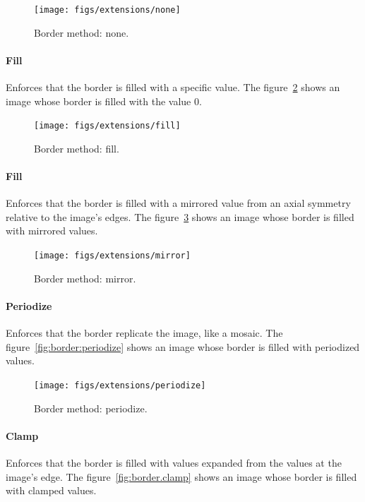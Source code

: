 \begin{figure}[tbh]
  \centering
  \texttt{[image: figs/extensions/none]}
  \label{fig:border.none}
  \caption{Border method: none.}
\end{figure}

\paragraph{Fill} Enforces that the border is filled with a specific value. The figure~\cref{fig:border.fill} shows an
image whose border is filled with the value $0$.

\begin{figure}[tbh]
  \centering
  \texttt{[image: figs/extensions/fill]}
  \label{fig:border.fill}
  \caption{Border method: fill.}
\end{figure}

\paragraph{Fill} Enforces that the border is filled with a mirrored value from an axial symmetry relative to the image's
edges. The figure~\cref{fig:border.mirror} shows an image whose border is filled with mirrored values.

\begin{figure}[tbh]
  \centering
  \texttt{[image: figs/extensions/mirror]}
  \label{fig:border.mirror}
  \caption{Border method: mirror.}
\end{figure}

\paragraph{Periodize} Enforces that the border replicate the image, like a mosaic. The
figure~\cref{fig:border:periodize} shows an image whose border is filled with periodized values.

\begin{figure}[tbh]
  \centering
  \texttt{[image: figs/extensions/periodize]}
  \label{fig:border.periodize}
  \caption{Border method: periodize.}
\end{figure}

\paragraph{Clamp} Enforces that the border is filled with values expanded from the values at the image's edge. The
figure~\cref{fig:border.clamp} shows an image whose border is filled with clamped values.

